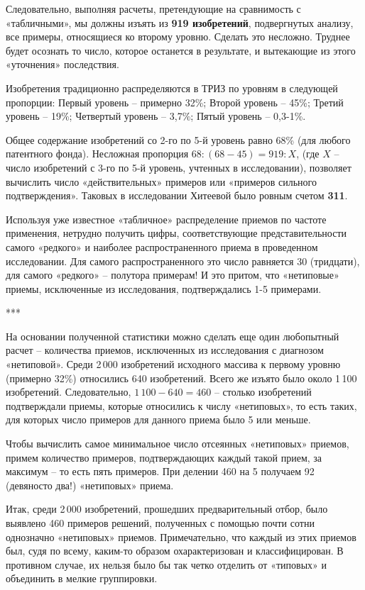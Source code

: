 \documentclass[11pt,a4paper]{article}
\begin{document}
Следовательно, выполняя расчеты, претендующие на сравнимость с «табличными»,
мы должны изъять из \textbf{919 изобретений}, подвергнутых анализу, все
примеры, относящиеся ко второму уровню. Сделать это несложно. Труднее будет
осознать то число, которое останется в результате, и вытекающие из этого
«уточнения» последствия.

Изобретения традиционно распределяются в ТРИЗ по уровням в следующей
пропорции: Первый уровень -- примерно 32\%; Второй уровень -- 45\%; Третий
уровень -- 19\%; Четвертый уровень -- 3{,}7\%; Пятый уровень -- 0{,}3-1\%.
\cite{Ivanov2012} 

Общее содержание изобретений со 2-го по 5-й уровень равно 68\% (для любого
патентного фонда). Несложная пропорция $68 : (68 - 45) = 919 : X$, (где $X$ --
число изобретений с 3-го по 5-й уровень, учтенных в исследовании), позволяет
вычислить число «действительных» примеров или «примеров сильного
подтверждения». Таковых в исследовании Хитеевой было ровным счетом
\textbf{311}.

Используя уже известное «табличное» распределение приемов по частоте
применения, нетрудно получить цифры, соответствующие представительности самого
«редкого» и наиболее распространенного приема в проведенном исследовании. Для
самого распространенного это число равняется 30 (тридцати), для самого
«редкого» -- полутора примерам! И это притом, что «нетиповые» приемы,
исключенные из исследования, подтверждались 1-5 примерами.

\begin{center}
  ***
\end{center}

На основании полученной статистики можно сделать еще один любопытный расчет --
количества приемов, исключенных из исследования с диагнозом «нетиповой». Среди
2\,000 изобретений исходного массива к первому уровню (примерно 32\%)
относились 640 изобретений. Всего же изъято было около 1\,100 изобретений.
Следовательно, $1\,100-640 = 460$ -- столько изобретений подтверждали приемы,
которые относились к числу «нетиповых», то есть таких, для которых число
примеров для данного приема было 5 или меньше.

Чтобы вычислить самое минимальное число отсеянных «нетиповых» приемов, примем
количество примеров, подтверждающих каждый такой прием, за максимум -- то есть
пять примеров. При делении 460 на 5 получаем 92 (девяносто два!) «нетиповых»
приема.

Итак, среди 2\,000 изобретений, прошедших предварительный отбор, было выявлено
460 примеров решений, полученных с помощью почти сотни однозначно «нетиповых»
приемов. Примечательно, что каждый из этих приемов был, судя по всему,
каким-то образом охарактеризован и классифицирован. В противном случае, их
нельзя было бы так четко отделить от «типовых» и объединить в мелкие
группировки.
\end{document}
